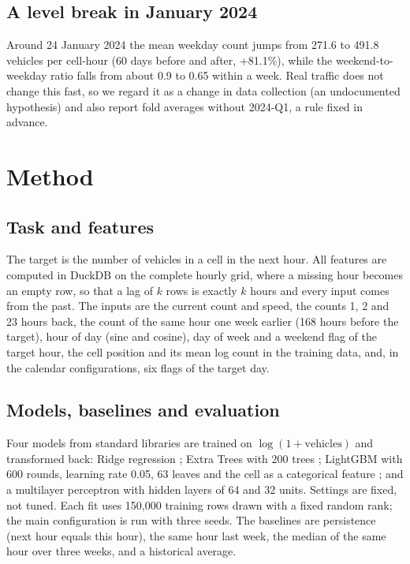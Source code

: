 \documentclass[sigconf]{acmart}
\begin{document}
\subsection{A level break in January 2024}
Around 24 January 2024 the mean weekday count jumps from 271.6 to 491.8 vehicles per cell-hour (60 days before and after, +81.1\%), while the weekend-to-weekday ratio falls from about 0.9 to 0.65 within a week. Real traffic does not change this fast, so we regard it as a change in data collection (an undocumented hypothesis) and also report fold averages without 2024-Q1, a rule fixed in advance.

\section{Method}
\subsection{Task and features}
The target is the number of vehicles in a cell in the next hour. All features are computed in DuckDB \cite{raasveldt2019} on the complete hourly grid, where a missing hour becomes an empty row, so that a lag of $k$ rows is exactly $k$ hours and every input comes from the past. The inputs are the current count and speed, the counts 1, 2 and 23 hours back, the count of the same hour one week earlier (168 hours before the target), hour of day (sine and cosine), day of week and a weekend flag of the target hour, the cell position and its mean log count in the training data, and, in the calendar configurations, six flags of the target day.

\subsection{Models, baselines and evaluation}
Four models from standard libraries \cite{pedregosa2011,ke2017} are trained on $\log(1+\text{vehicles})$ and transformed back: Ridge regression \cite{hoerl1970}; Extra Trees with 200 trees \cite{geurts2006}; LightGBM with 600 rounds, learning rate 0.05, 63 leaves and the cell as a categorical feature \cite{ke2017}; and a multilayer perceptron with hidden layers of 64 and 32 units. Settings are fixed, not tuned. Each fit uses 150{,}000 training rows drawn with a fixed random rank; the main configuration is run with three seeds. The baselines are persistence (next hour equals this hour), the same hour last week, the median of the same hour over three weeks, and a historical average.
\end{document}
